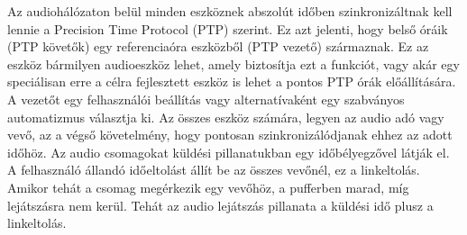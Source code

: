 Az audiohálózaton belül minden eszköznek abszolút időben szinkronizáltnak kell lennie
a Precision Time Protocol (PTP) szerint. Ez azt jelenti, hogy belső óráik (PTP
követők) egy referenciaóra eszközből (PTP vezető) származnak. Ez az eszköz
bármilyen audioeszköz lehet, amely biztosítja ezt a funkciót, vagy akár egy
speciálisan erre a célra fejlesztett eszköz is lehet a pontos PTP órák előállítására.
A vezetőt egy felhasználói beállítás vagy alternatívaként egy szabványos
automatizmus választja ki. Az összes eszköz számára, legyen az audio adó vagy
vevő, az a végső követelmény, hogy pontosan szinkronizálódjanak ehhez az adott időhöz.
Az audio csomagokat küldési pillanatukban egy időbélyegzővel látják el. A felhasználó állandó időeltolást állít be az
összes vevőnél, ez a linkeltolás. Amikor tehát a csomag megérkezik egy vevőhöz, a
pufferben marad, míg lejátszásra nem kerül. Tehát az audio lejátszás pillanata a
küldési idő plusz a linkeltolás. \newline

